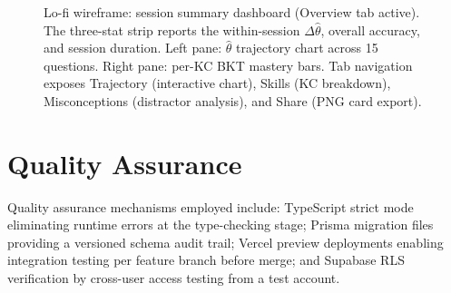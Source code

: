 \begin{figure}[H]
\caption{Lo-fi wireframe: session summary dashboard (Overview tab active).
  The three-stat strip reports the within-session $\Delta\hat{\theta}$,
  overall accuracy, and session duration. Left pane: $\hat{\theta}$ trajectory
  chart across 15 questions. Right pane: per-KC BKT mastery bars.
  Tab navigation exposes Trajectory (interactive chart), Skills (KC breakdown),
  Misconceptions (distractor analysis), and Share (PNG card export).}
\label{fig:lofi_summary}
\end{figure}

\section{Quality Assurance}
\label{sec:meth_qa}

Quality assurance mechanisms employed include: TypeScript strict mode
eliminating runtime errors at the type-checking stage; Prisma migration files
providing a versioned schema audit trail; Vercel preview deployments enabling
integration testing per feature branch before merge; and Supabase RLS
verification by cross-user access testing from a test account.
